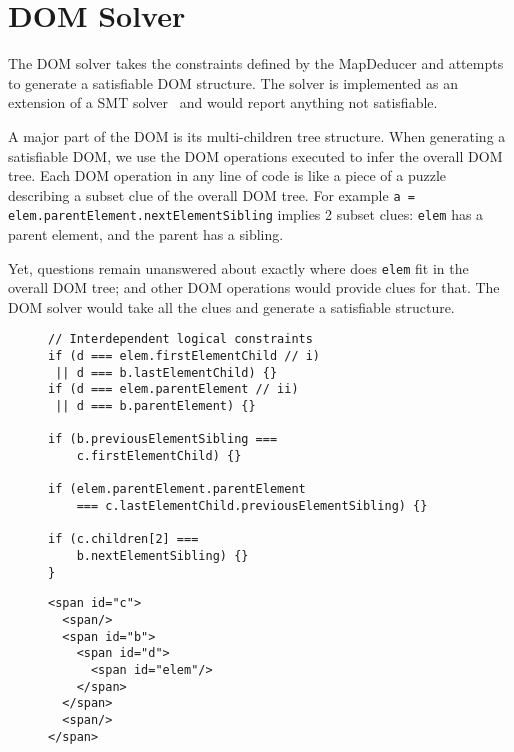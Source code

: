 \section{DOM Solver}
The DOM solver takes the constraints defined by the MapDeducer and attempts to generate a satisfiable DOM structure.  The solver is implemented as an extension of a SMT solver~\cite{cvc3} and would report anything not satisfiable.  

A major part of the DOM is its multi-children tree structure.  When generating a satisfiable DOM, we use the DOM operations executed to infer the overall DOM tree.    
Each DOM operation in any line of code is like a piece of a puzzle describing a subset clue of the overall DOM tree.   
For example {\tt a = elem.parentElement.nextElementSibling} implies 2 subset clues: {\tt elem} has a parent element, and the parent has a sibling.

Yet, questions remain unanswered about exactly where does {\tt elem} fit in the overall DOM tree; and other DOM operations would provide clues for that.  The DOM solver would take all the clues and generate a satisfiable structure.   

\begin{figure}
\begin{lstlisting}[caption=Example extended from Sample Code ~\ref{domOr} to demonstrate capability of DOM solver to resolve more complex DOM operations and their interdependency with each other.,label=domOrExtended]  
// Interdependent logical constraints
if (d === elem.firstElementChild // i)
 || d === b.lastElementChild) {}
if (d === elem.parentElement // ii)
 || d === b.parentElement) {}
  
if (b.previousElementSibling === 
    c.firstElementChild) {}
  
if (elem.parentElement.parentElement 
    === c.lastElementChild.previousElementSibling) {}
	  
if (c.children[2] === 
    b.nextElementSibling) {}  
}
\end{lstlisting}
\end{figure}


\begin{figure}
\begin{lstlisting}[caption=Condensed example extended from Sample Code ~\ref{domOr} demonstrating various DOM operations and their interdependency with each other.,label=domOrExtended]  
<span id="c">
  <span/>
  <span id="b">
    <span id="d">
      <span id="elem"/>
    </span>
  </span>
  <span/>
</span>
\end{lstlisting}
\end{figure}


